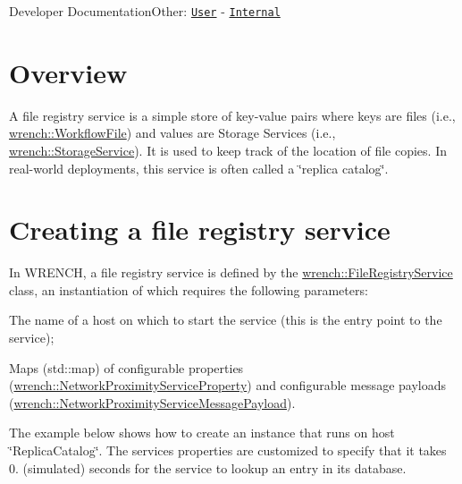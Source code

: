 Developer DocumentationOther\+: \href{../user/guide-fileregistry.html}{\tt User} -\/ \href{../internal/guide-fileregistry.html}{\tt Internal}\hypertarget{guide-fileregistry_guide-fileregistry-overview}{}\section{Overview}\label{guide-fileregistry_guide-fileregistry-overview}
A file registry service is a simple store of key-\/value pairs where keys are files (i.\+e., {\ttfamily \hyperlink{classwrench_1_1_workflow_file}{wrench\+::\+Workflow\+File}}) and values are Storage Services (i.\+e., {\ttfamily \hyperlink{classwrench_1_1_storage_service}{wrench\+::\+Storage\+Service}}). It is used to keep track of the location of file copies. In real-\/world deployments, this service is often called a \char`\"{}replica catalog\char`\"{}.\hypertarget{guide-fileregistry_guide-fileregistry-creating}{}\section{Creating a file registry service}\label{guide-fileregistry_guide-fileregistry-creating}
In W\+R\+E\+N\+CH, a file registry service is defined by the {\ttfamily \hyperlink{classwrench_1_1_file_registry_service}{wrench\+::\+File\+Registry\+Service}} class, an instantiation of which requires the following parameters\+:


\begin{DoxyItemize}
\item The name of a host on which to start the service (this is the entry point to the service);
\item Maps ({\ttfamily std\+::map}) of configurable properties ({\ttfamily \hyperlink{classwrench_1_1_network_proximity_service_property}{wrench\+::\+Network\+Proximity\+Service\+Property}}) and configurable message payloads ({\ttfamily \hyperlink{classwrench_1_1_network_proximity_service_message_payload}{wrench\+::\+Network\+Proximity\+Service\+Message\+Payload}}).
\end{DoxyItemize}

The example below shows how to create an instance that runs on host \char`\"{}\+Replica\+Catalog\char`\"{}. The service\textquotesingle{}s properties are customized to specify that it takes 0. (simulated) seconds for the service to lookup an entry in its database.


